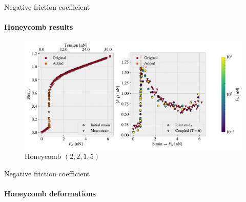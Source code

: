 \documentclass[
	10pt, %
]{beamer}
\begin{document}
\begin{frame}{Negative friction coefficient}
	\framesubtitle{Honeycomb results}
	\begin{figure}[H]
		\centering
		\includegraphics[width=\linewidth]{../thesis/figures/negative_coefficient/manual_coupling_tension_hon2215.pdf}	
	\caption{Honeycomb $(2,2,1,5)$}
	\end{figure}	
\end{frame}
%
%
\begin{frame}{Negative friction coefficient}
	\framesubtitle{Honeycomb deformations}
	\begin{figure}
		\centering    
	\end{figure} 
\end{frame}

%
%
\end{document}
